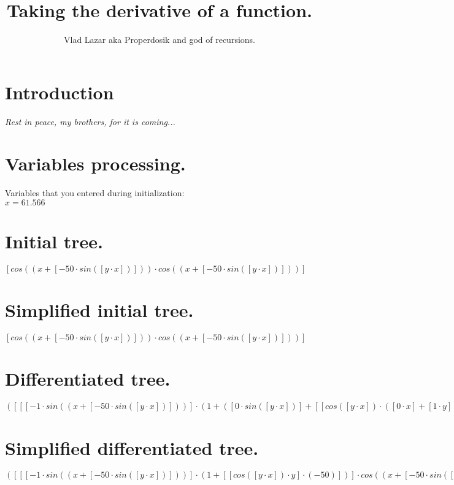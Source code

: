 \documentclass{article}
\title{\vspace{-1.0cm}\textbf{Taking the derivative of a function.}}
\author{Vlad Lazar aka Properdosik and god of recursions.}
\begin{document}
\maketitle
\section{Introduction}
\textit{Rest in peace, my brothers, for it is coming...}

\section{Variables processing.}
Variables that you entered during initialization:\\
$x = 61.566$

\section{Initial tree.}
$[cos((x + [-50 \cdot sin([y \cdot x])])) \cdot cos((x + [-50 \cdot sin([y \cdot x])]))]$

\section{Simplified initial tree.}
$[cos((x + [-50 \cdot sin([y \cdot x])])) \cdot cos((x + [-50 \cdot sin([y \cdot x])]))]$

\section{Differentiated tree.}
$([[[-1 \cdot sin((x + [-50 \cdot sin([y \cdot x])]))] \cdot (1 + ([0 \cdot sin([y \cdot x])] + [[cos([y \cdot x]) \cdot ([0 \cdot x] + [1 \cdot y])] \cdot -50]))] \cdot cos((x + [-50 \cdot sin([y \cdot x])]))] + [[[-1 \cdot sin((x + [-50 \cdot sin([y \cdot x])]))] \cdot (1 + ([0 \cdot sin([y \cdot x])] + [[cos([y \cdot x]) \cdot ([0 \cdot x] + [1 \cdot y])] \cdot -50]))] \cdot cos((x + [-50 \cdot sin([y \cdot x])]))])$

\section{Simplified differentiated tree.}
$([[[-1 \cdot sin((x + [-50 \cdot sin([y \cdot x])]))] \cdot (1 + [[cos([y \cdot x]) \cdot y] \cdot (-50)])] \cdot cos((x + [-50 \cdot sin([y \cdot x])]))] + [[[-1 \cdot sin((x + [-50 \cdot sin([y \cdot x])]))] \cdot (1 + [[cos([y \cdot x]) \cdot y] \cdot (-50)])] \cdot cos((x + [-50 \cdot sin([y \cdot x])]))])$
\end{document}
